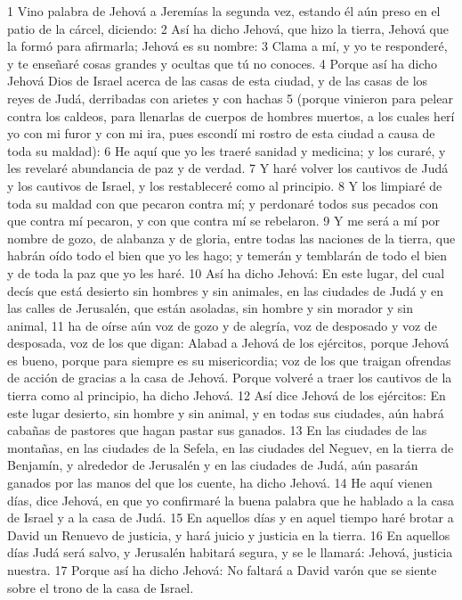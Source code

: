 1 Vino palabra de Jehová a Jeremías la segunda vez, estando él aún preso en el patio de la cárcel, diciendo:
2 Así ha dicho Jehová, que hizo la tierra, Jehová que la formó para afirmarla; Jehová es su nombre:
3 Clama a mí, y yo te responderé, y te enseñaré cosas grandes y ocultas que tú no conoces.
4 Porque así ha dicho Jehová Dios de Israel acerca de las casas de esta ciudad, y de las casas de los reyes de Judá, derribadas con arietes y con hachas
5 (porque vinieron para pelear contra los caldeos, para llenarlas de cuerpos de hombres muertos, a los cuales herí yo con mi furor y con mi ira, pues escondí mi rostro de esta ciudad a causa de toda su maldad):
6 He aquí que yo les traeré sanidad y medicina; y los curaré, y les revelaré abundancia de paz y de verdad.
7 Y haré volver los cautivos de Judá y los cautivos de Israel, y los restableceré como al principio.
8 Y los limpiaré de toda su maldad con que pecaron contra mí; y perdonaré todos sus pecados con que contra mí pecaron, y con que contra mí se rebelaron.
9 Y me será a mí por nombre de gozo, de alabanza y de gloria, entre todas las naciones de la tierra, que habrán oído todo el bien que yo les hago; y temerán y temblarán de todo el bien y de toda la paz que yo les haré.
10 Así ha dicho Jehová: En este lugar, del cual decís que está desierto sin hombres y sin animales, en las ciudades de Judá y en las calles de Jerusalén, que están asoladas, sin hombre y sin morador y sin animal,
11 ha de oírse aún voz de gozo y de alegría, voz de desposado y voz de desposada, voz de los que digan: Alabad a Jehová de los ejércitos, porque Jehová es bueno, porque para siempre es su misericordia; voz de los que traigan ofrendas de acción de gracias a la casa de Jehová. Porque volveré a traer los cautivos de la tierra como al principio, ha dicho Jehová.
12 Así dice Jehová de los ejércitos: En este lugar desierto, sin hombre y sin animal, y en todas sus ciudades, aún habrá cabañas de pastores que hagan pastar sus ganados.
13 En las ciudades de las montañas, en las ciudades de la Sefela, en las ciudades del Neguev, en la tierra de Benjamín, y alrededor de Jerusalén y en las ciudades de Judá, aún pasarán ganados por las manos del que los cuente, ha dicho Jehová.
14 He aquí vienen días, dice Jehová, en que yo confirmaré la buena palabra que he hablado a la casa de Israel y a la casa de Judá.
15 En aquellos días y en aquel tiempo haré brotar a David un Renuevo de justicia, y hará juicio y justicia en la tierra.
16 En aquellos días Judá será salvo, y Jerusalén habitará segura, y se le llamará: Jehová, justicia nuestra. 
17 Porque así ha dicho Jehová: No faltará a David varón que se siente sobre el trono de la casa de Israel. 
